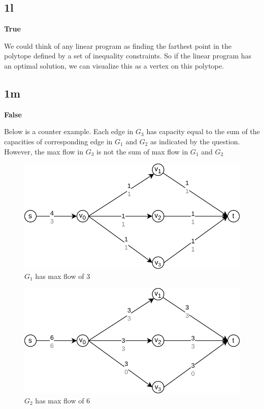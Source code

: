 \documentclass{article}
\begin{document}
    \subsection*{1l}
    \textbf{True}

    We could think of any linear program as finding the farthest point in the polytope defined by a set of inequality constraints. So if the linear program has an optimal solution, we can visualize this as a vertex on this polytope.

    \subsection*{1m}
    \textbf{False}

    Below is a counter example. Each edge in $G_3$ has capacity equal to the sum of the capacities of corresponding edge in $G_1$ and $G_2$ as indicated by the question. However, the max flow in $G_3$ is not the sum of max flow in $G_1$ and $G_2$

    \begin{figure}[H]
        \includegraphics[width=1\textwidth]{maxflow1.png}
        \caption{$G_1$ has max flow of 3}
    \end{figure}

    \begin{figure}[H]
        \includegraphics[width=1\textwidth]{maxflow2.png}
        \caption{$G_2$ has max flow of 6}
    \end{figure}
\end{document}

